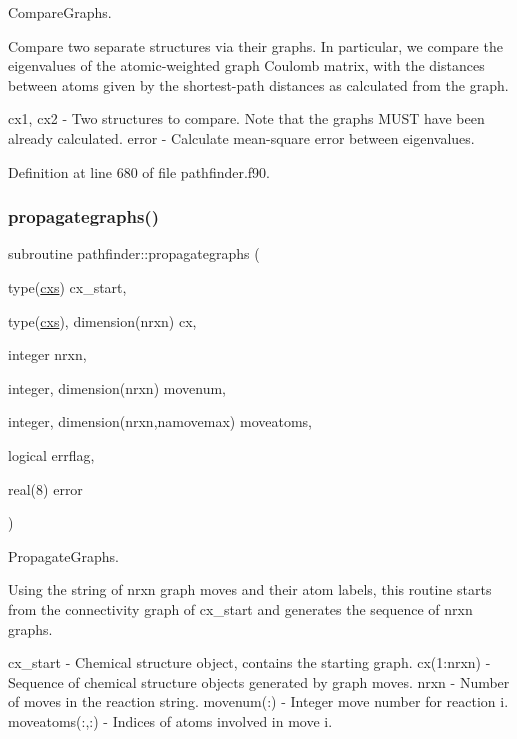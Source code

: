 Compare\+Graphs. 

Compare two separate structures via their graphs. In particular, we compare the eigenvalues of the atomic-\/weighted graph Coulomb matrix, with the distances between atoms given by the shortest-\/path distances as calculated from the graph.

cx1, cx2 -\/ Two structures to compare. Note that the graphs M\+U\+ST have been already calculated. error -\/ Calculate mean-\/square error between eigenvalues. 

Definition at line 680 of file pathfinder.\+f90.

\mbox{\label{namespacepathfinder_aeff32d131039907ab2149ee86575c84b}} 
\subsubsection{\texorpdfstring{propagategraphs()}{propagategraphs()}\hspace{0.1cm}{\footnotesize\ttfamily [1/2]}}
{\footnotesize\ttfamily subroutine pathfinder\+::propagategraphs (\begin{DoxyParamCaption}\item[{type(\mbox{\hyperlink{structchemstr_1_1cxs}{cxs}})}]{cx\+\_\+start,  }\item[{type(\mbox{\hyperlink{structchemstr_1_1cxs}{cxs}}), dimension(nrxn)}]{cx,  }\item[{integer}]{nrxn,  }\item[{integer, dimension(nrxn)}]{movenum,  }\item[{integer, dimension(nrxn,namovemax)}]{moveatoms,  }\item[{logical}]{errflag,  }\item[{real(8)}]{error }\end{DoxyParamCaption})}



Propagate\+Graphs. 

Using the string of nrxn graph moves and their atom labels, this routine starts from the connectivity graph of cx\+\_\+start and generates the sequence of nrxn graphs.

cx\+\_\+start -\/ Chemical structure object, contains the starting graph. cx(1\+:nrxn) -\/ Sequence of chemical structure objects generated by graph moves. nrxn -\/ Number of moves in the reaction string. movenum(\+:) -\/ Integer move number for reaction i. moveatoms(\+:,\+:) -\/ Indices of atoms involved in move i. 

